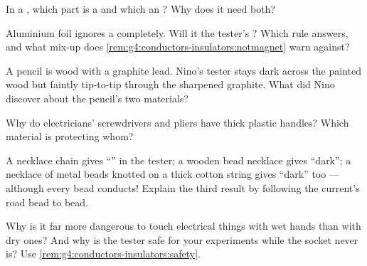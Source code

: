 \begin{exercise}[$\star$]\label{exo:g4:conductors-insulators:6}
In a , which part is a  and which an
? Why does it need both?
\end{exercise}

\begin{exercise}[$\star$]\label{exo:g4:conductors-insulators:7}
Aluminium foil ignores a  completely. Will it  the
tester's ? Which rule answers, and what mix-up does
\cref{rem:g4:conductors-insulators:notmagnet} warn against?
\end{exercise}

\begin{exercise}[$\star$]\label{exo:g4:conductors-insulators:8}
A pencil is wood with a graphite lead. Nino's tester stays dark
across the painted wood but  faintly tip-to-tip through the
sharpened graphite. What did Nino discover about the pencil's two
materials?
\end{exercise}

\begin{exercise}[$\star$]\label{exo:g4:conductors-insulators:9}
Why do electricians' screwdrivers and pliers have thick plastic
handles? Which material is protecting whom?
\end{exercise}

\begin{exercise}[$\star\star$]\label{exo:g4:conductors-insulators:10}
A necklace chain gives ``'' in the tester; a wooden bead
necklace gives ``dark''; a necklace of metal beads knotted on a
thick cotton string gives ``dark'' too --- although every bead
conducts! Explain the third result by following the current's
road bead to bead.
\end{exercise}

\begin{exercise}[$\star\star$]\label{exo:g4:conductors-insulators:11}
Why is it far more dangerous to touch electrical things with wet
hands than with dry ones? And why is the  tester safe for
your experiments while the socket never is? Use
\cref{rem:g4:conductors-insulators:safety}.
\end{exercise}
